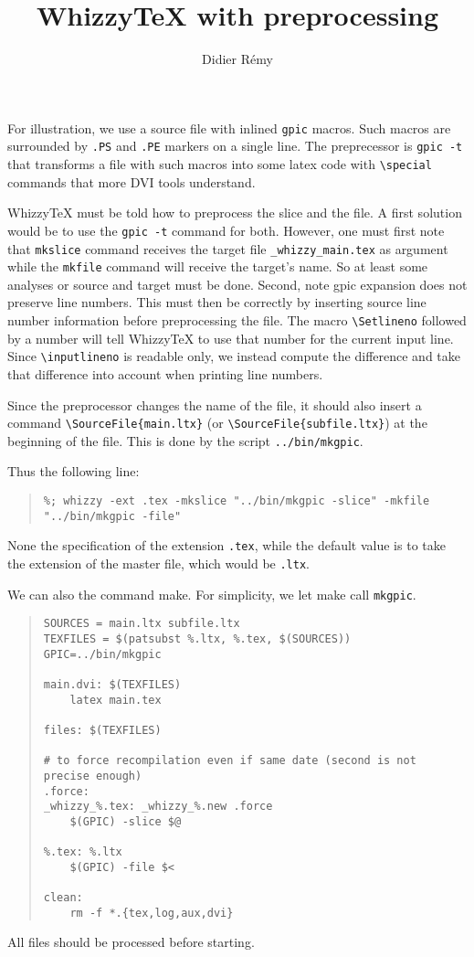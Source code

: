 \documentclass{article}
\title {WhizzyTeX with preprocessing}
\author {Didier R{\'e}my}
\let \lst \verb
\begin{document}
\maketitle

For illustration, we use a source file with inlined {\tt gpic} macros.
Such macros are surrounded by \lst".PS" and \lst".PE" markers on a single
line. The preprecessor is \lst"gpic -t" that transforms a file with such
macros into some latex code with \lst"\special" commands that more
DVI tools understand. 

WhizzyTeX must be told how to preprocess the slice and the file. 
A first solution would be to use the \lst"gpic -t" command for both.
However, one must first note that \lst"mkslice" command receives the target
file \lst"_whizzy_main.tex" as argument while the \lst"mkfile" command will
receive the target's name. So at least some analyses or source and target
must be done. Second, note gpic expansion does not preserve line numbers. 
This must then be correctly by inserting source line number information
before preprocessing the file. The macro \lst"\Setlineno" followed by a
number will tell WhizzyTeX to use that number for the current input line.
Since \lst"\inputlineno" is readable only, we instead compute the difference
and take that difference into account when printing line numbers. 

Since the preprocessor changes the name of the file, it should also insert
a command \lst"\SourceFile{main.ltx}" (or \lst"\SourceFile{subfile.ltx}")
at the beginning of the file. This is done by the script
\lst"../bin/mkgpic". 

Thus the following line:
\begin{quote}\small
\begin{verbatim}
%; whizzy -ext .tex -mkslice "../bin/mkgpic -slice" -mkfile "../bin/mkgpic -file"
\end{verbatim}
\end{quote}
None the specification of the extension \lst".tex", while the default value
is to take the extension of the master file, which would be \lst".ltx". 

We can also the command make. For simplicity, we let make call
\lst"mkgpic". 
\begin{quote}
\begin{verbatim}
SOURCES = main.ltx subfile.ltx
TEXFILES = $(patsubst %.ltx, %.tex, $(SOURCES))
GPIC=../bin/mkgpic

main.dvi: $(TEXFILES)
	latex main.tex

files: $(TEXFILES)

# to force recompilation even if same date (second is not precise enough)
.force:
_whizzy_%.tex: _whizzy_%.new .force
	$(GPIC) -slice $@

%.tex: %.ltx
	$(GPIC) -file $<

clean:
	rm -f *.{tex,log,aux,dvi}
\end{verbatim}
\end{quote}
All files should be processed before starting.
\end{document}
